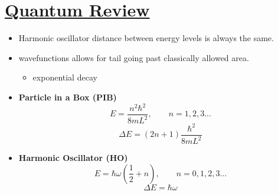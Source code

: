 
\setcounter{section}{1}

\section[Quantum Review]{\hyperlink{toc}{Quantum Review}}

\begin{itemize}
    \item Harmonic oscillator distance between energy levels is always the same.
    \item wavefunctions allows for tail going past classically allowed area.
    \begin{itemize}
        \item exponential decay
    \end{itemize}
    \item \textbf{Particle in a Box (PIB)}
    \[E = \frac{n^2\hbar^2}{8mL^2}, \qquad n = 1,2,3...\]
    \[\Delta E = (2n+1) \frac{\hbar^2}{8mL^2}\]
    \item \textbf{Harmonic Oscillator (HO)}
    \[E = \hbar \omega (\frac{1}{2} + n), \qquad n=0,1,2,3...\]
    \[\Delta E = \hbar \omega\]
    

\end{itemize}
